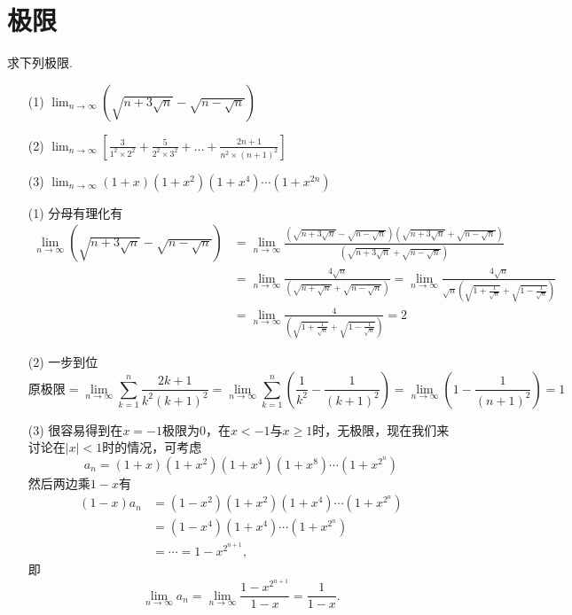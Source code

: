 \section{极限}
\begin{xiti}
\item 求下列极限.
\begin{enumerate}
	\item[(1)] $\lim _ { n \rightarrow \infty } ( \sqrt { n + 3 \sqrt { n } } - \sqrt { n - \sqrt { n } } )$
	\item[(2)] $\lim _ { n \rightarrow \infty } \left[ \frac { 3 } { 1 ^ { 2 } \times 2 ^ { 2 } } + \frac { 5 } { 2 ^ { 2 } \times 3 ^ { 2 } } + \dots + \frac { 2 n + 1 } { n ^ { 2 } \times ( n + 1 ) ^ { 2 } } \right]$
	\item[(3)] $\lim _ { n \rightarrow \infty } ( 1 + x ) \left( 1 + x ^ { 2 } \right) \left( 1 + x ^ { 4 } \right) \cdots \left( 1 + x ^ { 2 n } \right)$
\end{enumerate}
\begin{solution}
	\begin{enumerate}
		\item[(1)] 分母有理化有
		\begin{align*}
		\lim_{n\rightarrow\infty}\left(\sqrt{n+3\sqrt{n}}-\sqrt{n-\sqrt{n}}\right)&=\lim_{n\rightarrow\infty}\frac{\left(\sqrt{n+3\sqrt{n}}-\sqrt{n-\sqrt{n}}\right)\left(\sqrt{n+3\sqrt{n}}+\sqrt{n-\sqrt{n}}\right)}{\left(\sqrt{n+3\sqrt{n}}+\sqrt{n-\sqrt{n}}\right)}\\
		&=\lim_{n\rightarrow\infty}\frac{4\sqrt{n}}{\left(\sqrt{n+\sqrt{n}}+\sqrt{n-\sqrt{n}}\right)}=\lim_{n\rightarrow\infty}\frac{4\sqrt{n}}{\sqrt{n}\left(\sqrt{1+\frac{1}{\sqrt{n}}}+\sqrt{1-\frac{1}{\sqrt{n}}}\right)}\\
		&=\lim_{n\rightarrow\infty}\frac{4}{\left(\sqrt{1+\frac{1}{\sqrt{n}}}+\sqrt{1-\frac{1}{\sqrt{n}}}\right)}=2
		\end{align*}
		\item[(2)] 一步到位
		\[
		\textrm{原极限}=\lim_{n\rightarrow\infty}\sum_{k=1}^n{\frac{2k+1}{k^2\left(k+1\right)^2}}=\lim_{n\rightarrow\infty}\sum_{k=1}^n{\left(\frac{1}{k^2}-\frac{1}{\left(k+1\right)^2}\right)}=\lim_{n\rightarrow\infty}\left(1-\frac{1}{\left(n+1\right)^2}\right)=1
		\]
		\item[(3)] 很容易得到在$x=-1$极限为$0$，在$x<-1$与$x\geq 1$时，无极限，现在我们来讨论在$|x|<1$时的情况，可考虑
		\[a_n=(1+x)(1+x^2)(1+x^4)(1+x^8)\cdots (1+x^{2^n})\]
		然后两边乘$1-x$有
		\begin{align*}
		(1-x)a_n&=(1-x^2)(1+x^2)(1+x^4)\cdots(1+x^{2^n})\\
		& = (1-x^4)(1+x^4)\cdots(1+x^{2^n})\\
		&=\cdots =1-x^{2^{n+1}},
		\end{align*}
		即
		\[\lim_{n\to\infty}a_n=\lim_{n\to\infty}\frac{1-x^{2^{n+1}}}{1-x}=\frac{1}{1-x}.\]
		

\end{enumerate}
\end{solution}
\end{xiti}
